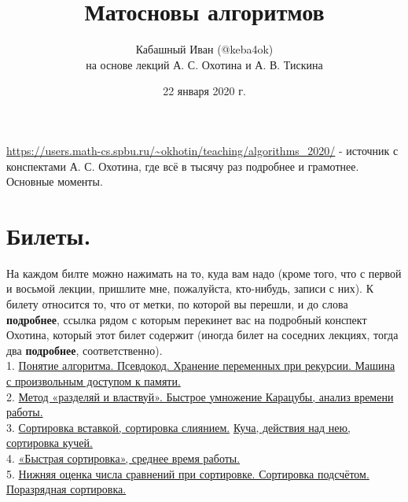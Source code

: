 \documentclass[a4paper]{article}
\title{Матосновы алгоритмов}
\author{Кабашный Иван (@keba4ok) \\ на основе лекций А. С. Охотина и А. В. Тискина}
\date{22 января 2020 г.}
\theoremstyle{indented}
\theoremstyle{definition}
\theoremstyle{remark}
\begin{document}
\newcommand{\resetexlcounters}{%
  \setcounter{exl}{0}%
} 

\newcommand{\resetremarkcounters}{%
  \setcounter{remark}{0}%
} 

\newcommand{\reseconscounters}{%
  \setcounter{cons}{0}%
} 

\newcommand{\resetall}{%
    \resetexlcounters
    \resetremarkcounters
    \reseconscounters%
}

\maketitle 

\newpage

\url{https://users.math-cs.spbu.ru/~okhotin/teaching/algorithms_2020/} - источник с конспектами А. С. Охотина, где всё в тысячу раз подробнее и грамотнее. \\

\hypertarget{t1}{Основные моменты}. 
\tableofcontents

\newpage

\section{Билеты.}

На каждом билте можно нажимать на то, куда вам надо (кроме того, что с первой и восьмой лекции, пришлите мне, пожалуйста, кто-нибудь, записи с них). К билету относится то, что от метки, по которой вы перешли, и до слова \textbf{подробнее}, ссылка рядом с которым перекинет вас на подробный конспект Охотина, который этот билет содержит (иногда билет на соседних лекциях, тогда два \textbf{подробнее}, соответственно). \\

1. \hyperlink{d-1}{Понятие алгоритма. Псевдокод. Хранение переменных при рекурсии. Машина с произвольным доступом к памяти.} \\

2. \hyperlink{t-1}{Метод «разделяй и властвуй». Быстрое умножение Карацубы, анализ времени работы.} \\ 

3. \hyperlink{t-3}{Сортировка вставкой, сортировка слиянием.} \hyperlink{d1.5}{Куча, действия над нею, сортировка кучей.} \\ 

4. \hyperlink{r1}{«Быстрая сортировка», среднее время работы.} \\ 

5. \hyperlink{t2.5}{Нижняя оценка числа сравнений при сортировке. Сортировка подсчётом. Поразрядная сортировка.} \\ 
\end{document}
